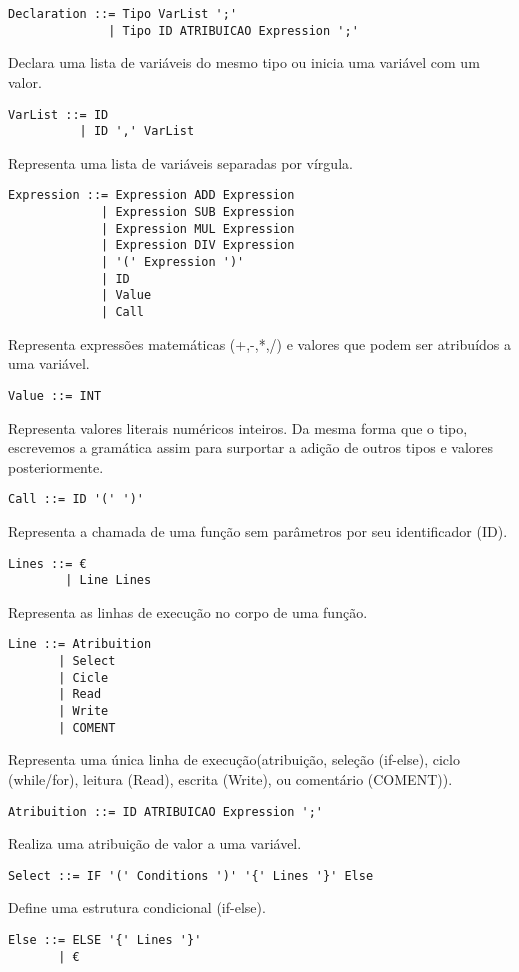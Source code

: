 \documentclass[12pt,a4paper]{report}
\begin{document}
\begin{lstlisting}
Declaration ::= Tipo VarList ';'
              | Tipo ID ATRIBUICAO Expression ';'
\end{lstlisting}
Declara uma lista de variáveis do mesmo tipo ou inicia uma variável com um valor.
\begin{lstlisting}
VarList ::= ID
          | ID ',' VarList 
\end{lstlisting}
Representa uma lista de variáveis separadas por vírgula.
\begin{lstlisting}
Expression ::= Expression ADD Expression
             | Expression SUB Expression
             | Expression MUL Expression
             | Expression DIV Expression
             | '(' Expression ')'
             | ID
             | Value
             | Call
\end{lstlisting}
Representa expressões matemáticas (+,-,*,/) e valores que podem ser atribuídos a uma variável.
\begin{lstlisting}
Value ::= INT
\end{lstlisting}
Representa valores literais numéricos inteiros. Da mesma forma que o tipo, escrevemos a gramática assim para surportar a adição de outros tipos e valores posteriormente.
\begin{lstlisting}
Call ::= ID '(' ')'
\end{lstlisting}
Representa a chamada de uma função sem parâmetros por seu identificador (ID).
\begin{lstlisting}
Lines ::= €
        | Line Lines
\end{lstlisting}
Representa as linhas de execução no corpo de uma função.
\begin{lstlisting}
Line ::= Atribuition
       | Select
       | Cicle
       | Read
       | Write
       | COMENT
\end{lstlisting}
Representa uma única linha de execução(atribuição, seleção (if-else), ciclo (while/for), leitura (Read), escrita (Write), ou comentário (COMENT)).
\begin{lstlisting}
Atribuition ::= ID ATRIBUICAO Expression ';'
\end{lstlisting}
Realiza uma atribuição de valor a uma variável.
\begin{lstlisting}
Select ::= IF '(' Conditions ')' '{' Lines '}' Else
\end{lstlisting}
Define uma estrutura condicional (if-else).
\begin{lstlisting}
Else ::= ELSE '{' Lines '}'
       | €
\end{lstlisting}
\end{document}
